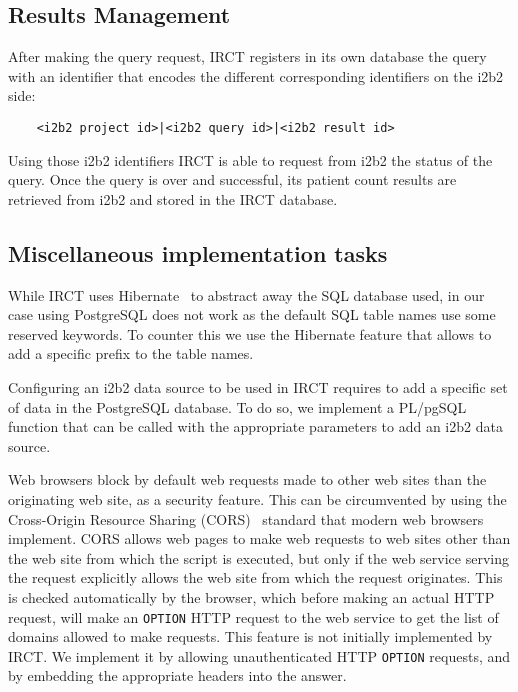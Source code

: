 \subsection{Results Management}

After making the query request, IRCT registers in its own database the query with an identifier that encodes the different corresponding identifiers on the i2b2 side:
\begin{verbatim}
    <i2b2 project id>|<i2b2 query id>|<i2b2 result id>
\end{verbatim}

Using those i2b2 identifiers IRCT is able to request from i2b2 the status of the query.
Once the query is over and successful, its patient count results are retrieved from i2b2 and stored in the IRCT database.


\subsection{Miscellaneous implementation tasks}

While IRCT uses Hibernate~\cite{wiki:hibernate} to abstract away the SQL database used, in our case using PostgreSQL does not work as the default SQL table names use some reserved keywords.
To counter this we use the Hibernate feature that allows to add a specific prefix to the table names.

Configuring an i2b2 data source to be used in IRCT requires to add a specific set of data in the PostgreSQL database.
To do so, we implement a PL/pgSQL function that can be called with the appropriate parameters to add an i2b2 data source.

Web browsers block by default web requests made to other web sites than the originating web site, as a security feature.
This can be circumvented by using the Cross-Origin Resource Sharing (CORS)~\cite{rfc:cors} standard that modern web browsers implement.
CORS allows web pages to make web requests to web sites other than the web site from which the script is executed, but only if the web service serving the request explicitly allows the web site from which the request originates.
This is checked automatically by the browser, which before making an actual HTTP request, will make an \verb|OPTION| HTTP request to the web service to get the list of domains allowed to make requests.
This feature is not initially implemented by IRCT.
We implement it by allowing unauthenticated HTTP \verb|OPTION| requests, and by embedding the appropriate headers into the answer.

